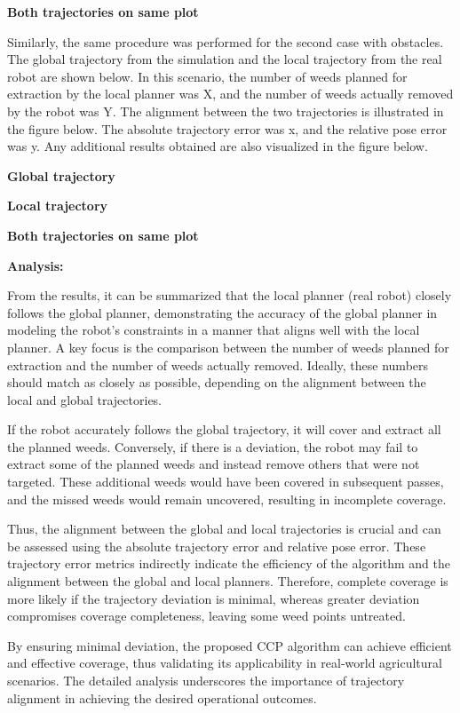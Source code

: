\textbf{Both trajectories on same  plot} 


\vspace*{6mm}   


Similarly, the same procedure was performed for the second case with obstacles. The global trajectory from the simulation and the local trajectory from the real robot are shown below. In this scenario, the number of weeds planned for extraction by the local planner was X, and the number of weeds actually removed by the robot was Y. The alignment between the two trajectories is illustrated in the figure below. The absolute trajectory error was x, and the relative pose error was y. Any additional results obtained are also visualized in the figure below.

\textbf{Global trajectory}

\textbf{Local trajectory}

\textbf{Both trajectories on same  plot} 


\vspace*{6mm}   


\textbf{Analysis: }

From the results, it can be summarized that the local planner (real robot) closely follows the global planner, demonstrating the accuracy of the global planner in modeling the robot's constraints in a manner that aligns well with the local planner. A key focus is the comparison between the number of weeds planned for extraction and the number of weeds actually removed. Ideally, these numbers should match as closely as possible, depending on the alignment between the local and global trajectories.

\vspace*{6mm}   

If the robot accurately follows the global trajectory, it will cover and extract all the planned weeds. Conversely, if there is a deviation, the robot may fail to extract some of the planned weeds and instead remove others that were not targeted. These additional weeds would have been covered in subsequent passes, and the missed weeds would remain uncovered, resulting in incomplete coverage.

\vspace*{6mm}   

Thus, the alignment between the global and local trajectories is crucial and can be assessed using the absolute trajectory error and relative pose error. These trajectory error metrics indirectly indicate the efficiency of the algorithm and the alignment between the global and local planners. Therefore, complete coverage is more likely if the trajectory deviation is minimal, whereas greater deviation compromises coverage completeness, leaving some weed points untreated.

\vspace*{6mm}   

By ensuring minimal deviation, the proposed CCP algorithm can achieve efficient and effective coverage, thus validating its applicability in real-world agricultural scenarios. The detailed analysis underscores the importance of trajectory alignment in achieving the desired operational outcomes.

\vspace*{6mm}   
